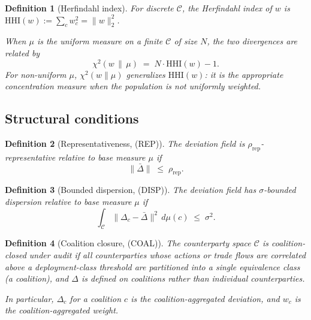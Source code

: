 \documentclass{article}
\newtheorem{definition}{Definition}
\newcommand{\HHI}{\mathrm{HHI}}
\newcommand{\chisq}{\chi^2}
\begin{document}
\begin{definition}[Herfindahl index]
\label{def:hhi-v2}
For discrete $\mathcal{C}$, the \emph{Herfindahl index} of $w$ is
$\HHI(w) := \sum_c w_c^2 = \|w\|_2^2$.

When $\mu$ is the uniform measure on a finite $\mathcal{C}$ of size
$N$, the two divergences are related by
\begin{equation}
\label{eq:chisq-hhi}
  \chisq(w \,\|\, \mu) \;=\; N \cdot \HHI(w) - 1.
\end{equation}
For non-uniform $\mu$, $\chisq(w \|\mu)$ generalizes $\HHI(w)$: it
is the appropriate concentration measure when the population is not
uniformly weighted.
\end{definition}

\subsection{Structural conditions}

\begin{definition}[Representativeness, (REP)]
\label{def:rep-v2}
The deviation field is \emph{$\rho_\mathrm{rep}$-representative}
relative to base measure $\mu$ if
\begin{equation}
  \|\bar\Delta\| \;\leq\; \rho_\mathrm{rep}.
\end{equation}
\end{definition}

\begin{definition}[Bounded dispersion, (DISP)]
\label{def:disp-v2}
The deviation field has \emph{$\sigma$-bounded dispersion}
relative to base measure $\mu$ if
\begin{equation}
  \int_\mathcal{C} \|\Delta_c - \bar\Delta\|^2 \,d\mu(c) \;\leq\;
  \sigma^2.
\end{equation}
\end{definition}

\begin{definition}[Coalition closure, (COAL)]
\label{def:coal-v2}
The counterparty space $\mathcal{C}$ is \emph{coalition-closed}
under audit if all counterparties whose actions or trade flows are
correlated above a deployment-class threshold are partitioned into
a single equivalence class (a coalition), and $\Delta$ is defined
on coalitions rather than individual counterparties.

In particular, $\Delta_c$ for a coalition $c$ is the
coalition-aggregated deviation, and $w_c$ is the
coalition-aggregated weight.
\end{definition}
\end{document}
